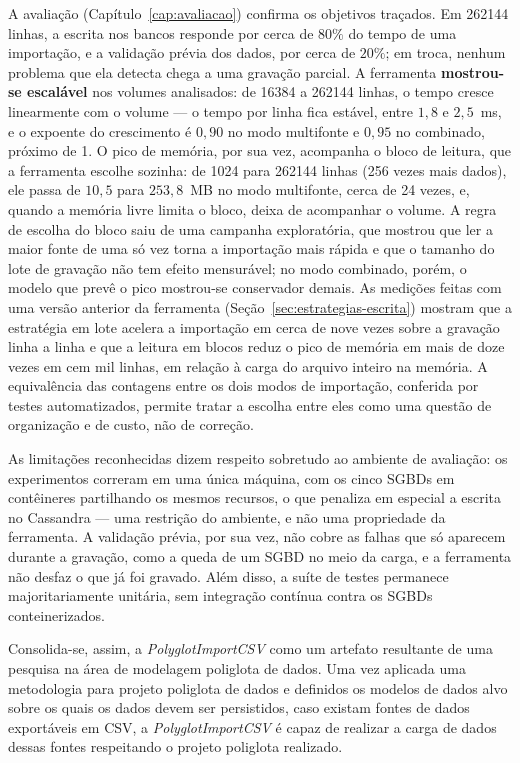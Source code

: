 A avaliação (Capítulo~\ref{cap:avaliacao}) confirma os objetivos
traçados. Em \num{262144} linhas, a escrita nos bancos responde por cerca de $80\%$ do tempo
de uma importação, e a validação prévia dos dados, por cerca de $20\%$; em troca, nenhum
problema que ela detecta chega a uma gravação parcial. A ferramenta \textbf{mostrou-se
escalável} nos volumes analisados: de \num{16384} a \num{262144} linhas, o tempo cresce
linearmente com o volume --- o tempo por linha fica estável, entre $1{,}8$ e $2{,}5$~ms, e o
expoente do crescimento é $0{,}90$ no modo multifonte e $0{,}95$ no combinado, próximo de 1.
O pico de memória, por sua vez, acompanha o bloco de leitura, que a ferramenta escolhe
sozinha: de \num{1024} para \num{262144} linhas (256 vezes mais dados), ele passa de
$10{,}5$ para $253{,}8$~MB no modo multifonte, cerca de 24 vezes, e, quando a memória livre
limita o bloco, deixa de acompanhar o volume. A regra de escolha do bloco saiu de uma
campanha exploratória, que mostrou que ler a maior fonte de uma só vez torna a importação
mais rápida e que o tamanho do lote de gravação não tem efeito mensurável; no modo
combinado, porém, o modelo que prevê o pico mostrou-se conservador demais. As medições feitas com uma versão anterior da ferramenta
(Seção~\ref{sec:estrategias-escrita}) mostram que a estratégia em lote acelera a importação
em cerca de nove vezes sobre a gravação linha a linha e que a leitura em blocos reduz o pico
de memória em mais de doze vezes em cem mil linhas, em relação à carga do arquivo inteiro na
memória. A equivalência das
contagens entre os dois modos de importação, conferida por testes automatizados, permite
tratar a escolha entre eles como uma questão de organização e de custo, não de correção.

As limitações reconhecidas dizem respeito sobretudo ao ambiente de avaliação: os experimentos
correram em uma única máquina, com os cinco SGBDs em contêineres partilhando os mesmos
recursos, o que penaliza em especial a escrita no Cassandra --- uma restrição do ambiente, e
não uma propriedade da ferramenta. A validação prévia, por sua vez, não cobre as falhas que
só aparecem durante a gravação, como a queda de um SGBD no meio da carga, e a ferramenta não
desfaz o que já foi gravado. Além disso, a suíte de testes permanece majoritariamente
unitária, sem integração contínua contra os SGBDs conteinerizados.

Consolida-se, assim, a \textit{PolyglotImportCSV} como um artefato resultante de uma
pesquisa na área de modelagem poliglota de dados. Uma vez aplicada uma metodologia para
projeto poliglota de dados e definidos os modelos de dados alvo sobre os quais os dados
devem ser persistidos, caso existam fontes de dados exportáveis em CSV, a
\textit{PolyglotImportCSV} é capaz de realizar a carga de dados dessas fontes respeitando o
projeto poliglota realizado.

